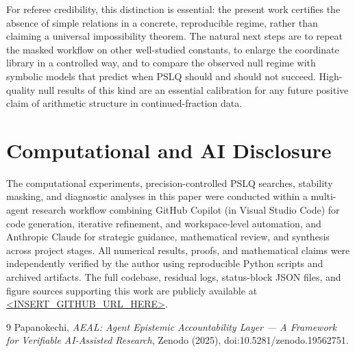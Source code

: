 \documentclass[11pt]{article}
\begin{document}
For referee credibility, this distinction is essential: the present work certifies the absence of simple relations in a concrete, reproducible regime, rather than claiming a universal impossibility theorem. The natural next steps are to repeat the masked workflow on other well-studied constants, to enlarge the coordinate library in a controlled way, and to compare the observed null regime with symbolic models that predict when PSLQ should and should not succeed. High-quality null results of this kind are an essential calibration for any future positive claim of arithmetic structure in continued-fraction data.

\section*{Computational and AI Disclosure}

The computational experiments, precision-controlled PSLQ searches, stability masking, and diagnostic analyses in this paper were conducted within a multi-agent research workflow combining GitHub Copilot (in Visual Studio Code) for code generation, iterative refinement, and workspace-level automation, and Anthropic Claude for strategic guidance, mathematical review, and synthesis across project stages. All numerical results, proofs, and mathematical claims were independently verified by the author using reproducible Python scripts and archived artifacts. The full codebase, residual logs, status-block JSON files, and figure sources supporting this work are publicly available at \url{<INSERT_GITHUB_URL_HERE>}.


\begin{thebibliography}{9}
 Papanokechi, \emph{AEAL: Agent Epistemic Accountability Layer --- A Framework for Verifiable AI-Assisted Research}, Zenodo (2025), doi:10.5281/zenodo.19562751.
\end{thebibliography}
\end{document}
